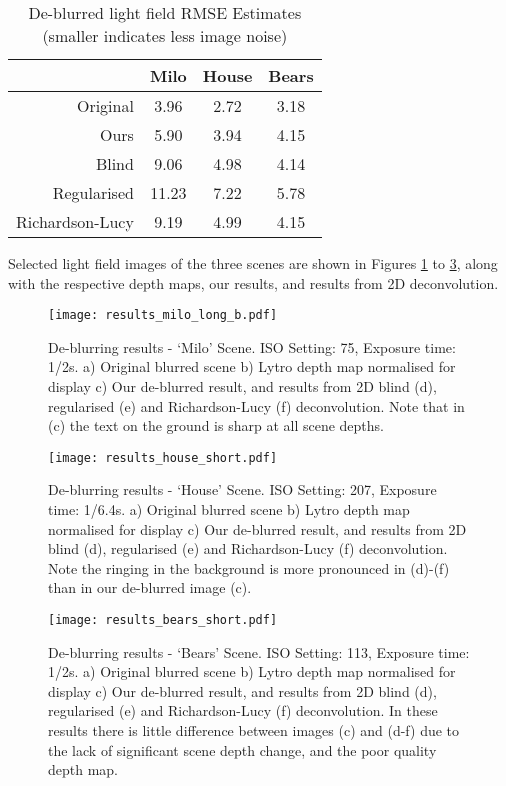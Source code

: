 \begin{table}[h]
\centering
\caption[De-blurred light field RMSE Estimates]{De-blurred light field RMSE Estimates (smaller indicates less image noise)}
\label{tab:deblurred_light_field_rmse_estimates}
\begin{tabular}[h]{r | c c c}
                & Milo  & House & Bears \\
\hline
Original        & 3.96  & 2.72 & 3.18 \\
Ours            & 5.90  & 3.94 & 4.15 \\
Blind           & 9.06  & 4.98 & 4.14 \\
Regularised     & 11.23 & 7.22 & 5.78 \\
Richardson-Lucy & 9.19  & 4.99 & 4.15 \\
\end{tabular}
\end{table}


Selected light field images of the three scenes are shown in Figures \ref{fig:results_milo_long_b} to \ref{fig:results_bears_short}, along with the respective depth maps, our results, and results from 2D deconvolution.


\begin{figure}[h]
\centering
\texttt{[image: results\_milo\_long\_b.pdf]}
\caption[De-blurring results - \enquote*{Milo} Scene]{
De-blurring results - \enquote*{Milo} Scene.
ISO Setting: 75, Exposure time: 1/2s.
a) Original blurred scene b) Lytro depth map normalised for display c) Our de-blurred result, and results from 2D blind (d), regularised (e) and Richardson-Lucy (f) deconvolution.
Note that in (c) the text on the ground is sharp at all scene depths.
}
\label{fig:results_milo_long_b}
\end{figure}

\begin{figure}[h]
\centering
\texttt{[image: results\_house\_short.pdf]}
\caption[De-blurring results - \enquote*{House} Scene]{
De-blurring results - \enquote*{House} Scene.
ISO Setting: 207, Exposure time: 1/6.4s.
a) Original blurred scene b) Lytro depth map normalised for display c) Our de-blurred result, and results from 2D blind (d), regularised (e) and Richardson-Lucy (f) deconvolution.
Note the ringing in the background is more pronounced in (d)-(f) than in our de-blurred image (c).
}
\label{fig:results_house_short}
\end{figure}

\begin{figure}[h]
\centering
\texttt{[image: results\_bears\_short.pdf]}
\caption[De-blurring results - \enquote*{Bears} Scene]{
De-blurring results - \enquote*{Bears} Scene.
ISO Setting: 113, Exposure time: 1/2s.
a) Original blurred scene b) Lytro depth map normalised for display c) Our de-blurred result, and results from 2D blind (d), regularised (e) and Richardson-Lucy (f) deconvolution.
In these results there is little difference between images (c) and (d-f) due to the lack of significant scene depth change, and the poor quality depth map.
}
\label{fig:results_bears_short}
\end{figure}



